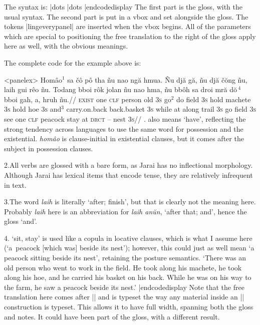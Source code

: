 The syntax is:
\codedisplay
\beginglpanel |dots \endgl |dots \endpanel
|endcodedisplay
The first part is the gloss, with the usual syntax.  The second
part is put in a vbox and set alongside the gloss. The tokens
|lingeverypanel| are inserted when the vbox begins. All of the
parameters which are special to positioning the free translation
to the right of the gloss apply here as well, with the obvious
meanings.

The complete code for the example above is:

\codedisplay
\ex[everypanel=\footnotesize]<panelex>
\def\\#1{{\footnotesize\uppercase{#1}}}%
\let\\=\textsc
\beginglpanel[ssratio=.5,glhangstyle=none]
\gla Hom\^{a}o$^1$ sa \v{c}\^{o} p\^{o} tha  \~{n}u nao ng\u{a}
hmua. \~{N}u dj\u{a} g\u{a}, \~{n}u dj\u{a} \v{c}\u{o}ng \~{n}u,
laih gui r\^{e}o \~{n}u. Todang bboi r\^{o}k jolan \~{n}u nao
hma, \~{n}u bb\^{o}h sa droi mr\u{a} d\u{o}$\,^4$ bboi gah, a, hruh
\~{n}u.//
\glb \\{exist} one \\{clf} person old \\{3s} go$^2$ do field
\\{3s} hold machete \\{3s} hold hoe \\{3s} and$^3$ carry.on.back
back.basket \\{3s} while at along trail \\{3s} go field \\{3s}
see one \\{clf} peacock stay at \\{drct} -- nest \\{3s}//
. also means `have', reflecting the
strong tendency across languages to use the same word for
possession and the existential. {\it hom\^{a}o} is clause-initial
in existential clauses, but it comes after the subject in
possession clauses.

2.\enspace All verbs are glossed with a bare form, as Jarai has
no inflectional morphology. Although Jarai has lexical items that
encode tense, they are relatively infrequent in text.

3.\enspace The word {\it laih} is literally `after; finish', but
that is clearly not the meaning here. Probably {\it laih} here is
an abbreviation for {\it laih an\u{u}n}, `after that; and', hence
the gloss `and'.

4. `sit, stay' is used like a copula in
locative clauses, which is what I assume here (`a~peacock [which
was] beside its nest'); however, this could just as well mean `a
peacock sitting beside its nest', retaining the posture
semantics.
\endpanel
\bigskip
`There was an old person who went to work in the field. He took
along his machete, he took along his hoe, and he carried his
basket on his back. While he was on his way to the farm, he saw a
peacock beside its nest.'
\xe
|endcodedisplay
Note that the free translation here comes after |\endpanel| and is
typeset the way any material inside an |\ex| construction is
typeset.  This allows it to have full width, spanning both the
gloss and notes.  It could have been part of the gloss, with a
different result.

